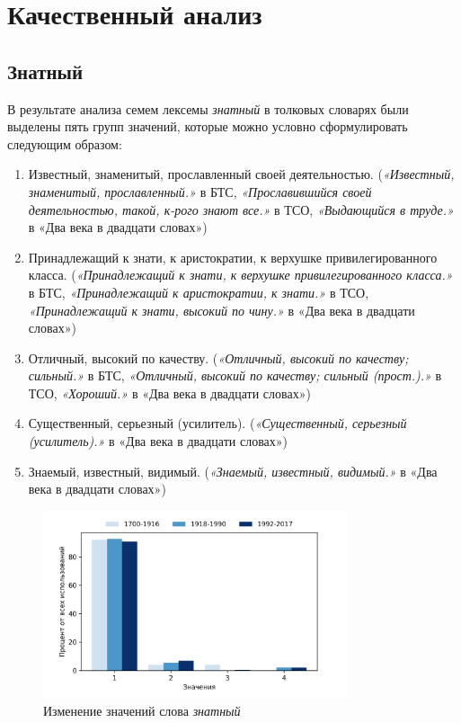 \chapter{Качественный анализ}

\section*{Знатный}

В результате анализа семем лексемы \textit{знатный} в толковых словарях были выделены пять групп значений,
которые можно условно сформулировать следующим образом:

\begin{enumerate}
    \item Известный, знаменитый, прославленный своей деятельностью.
    (\textit{«Известный, знаменитый, прославленный.»} в БТС,
    \textit{«Прославившийся своей деятельностью, такой, к-рого знают все.»} в ТСО,
    \textit{«Выдающийся в труде.»} в «Два века в двадцати словах»)

    \item Принадлежащий к знати, к аристократии, к верхушке привилегированного класса.
    (\textit{«Принадлежащий к знати, к верхушке привилегированного класса.»} в БТС,
    \textit{«Принадлежащий к аристократии, к знати.»} в ТСО,
    \textit{«Принадлежащий к знати, высокий по чину.»} в «Два века в двадцати словах»)

    \item Отличный, высокий по качеству.
    (\textit{«Отличный, высокий по качеству; сильный.»} в БТС,
    \textit{«Отличный, высокий по качеству; сильный (прост.).»} в ТСО,
    \textit{«Хороший.»} в «Два века в двадцати словах»)

    \item Существенный, серьезный (усилитель).
    (\textit{«Существенный, серьезный (усилитель).»} в «Два века в двадцати словах»)

    \item Знаемый, известный, видимый.
    (\textit{«Знаемый, известный, видимый.»} в «Два века в двадцати словах»)
\end{enumerate}

\begin{figure}[H]
	\centering
	\includegraphics[width=0.8\textwidth]{img/visualizations/znatnyj_minimal}
	\caption{Изменение значений слова \textit{знатный}}
	\label{fig:Знатный}
\end{figure}

